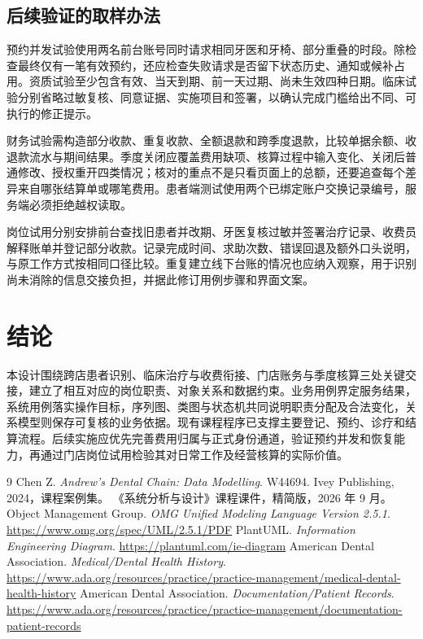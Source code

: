 \documentclass[12pt,a4paper,fontset=windows]{ctexart}
\begin{document}
\subsection{后续验证的取样办法}
预约并发试验使用两名前台账号同时请求相同牙医和牙椅、部分重叠的时段。除检查最终仅有一笔有效预约，还应检查失败请求是否留下状态历史、通知或候补占用。资质试验至少包含有效、当天到期、前一天过期、尚未生效四种日期。临床试验分别省略过敏复核、同意证据、实施项目和签署，以确认完成门槛给出不同、可执行的修正提示。

财务试验需构造部分收款、重复收款、全额退款和跨季度退款，比较单据余额、收退款流水与期间结果。季度关闭应覆盖费用缺项、核算过程中输入变化、关闭后普通修改、授权重开四类情况；核对的重点不是只看页面上的总额，还要追查每个差异来自哪张结算单或哪笔费用。患者端测试使用两个已绑定账户交换记录编号，服务端必须拒绝越权读取。

岗位试用分别安排前台查找旧患者并改期、牙医复核过敏并签署治疗记录、收费员解释账单并登记部分收款。记录完成时间、求助次数、错误回退及额外口头说明，与原工作方式按相同口径比较。重复建立线下台账的情况也应纳入观察，用于识别尚未消除的信息交接负担，并据此修订用例步骤和界面文案。

\section{结论}
本设计围绕跨店患者识别、临床治疗与收费衔接、门店账务与季度核算三处关键交接，建立了相互对应的岗位职责、对象关系和数据约束。业务用例界定服务结果，系统用例落实操作目标，序列图、类图与状态机共同说明职责分配及合法变化，关系模型则保存可复核的业务依据。现有课程程序已支撑主要登记、预约、诊疗和结算流程。后续实施应优先完善费用归属与正式身份通道，验证预约并发和恢复能力，再通过门店岗位试用检验其对日常工作及经营核算的实际价值。

\clearpage
{}
\begin{thebibliography}{9}\small
{} Chen Z. \emph{Andrew's Dental Chain: Data Modelling}. W44694. Ivey Publishing, 2024，课程案例集。
《系统分析与设计》课程课件，精简版，2026 年 9 月。
 Object Management Group. \emph{OMG Unified Modeling Language Version 2.5.1}. \url{https://www.omg.org/spec/UML/2.5.1/PDF}
 PlantUML. \emph{Information Engineering Diagram}. \url{https://plantuml.com/ie-diagram}
 American Dental Association. \emph{Medical/Dental Health History}. \url{https://www.ada.org/resources/practice/practice-management/medical-dental-health-history}
 American Dental Association. \emph{Documentation/Patient Records}. \url{https://www.ada.org/resources/practice/practice-management/documentation-patient-records}
\end{thebibliography}
\end{document}
